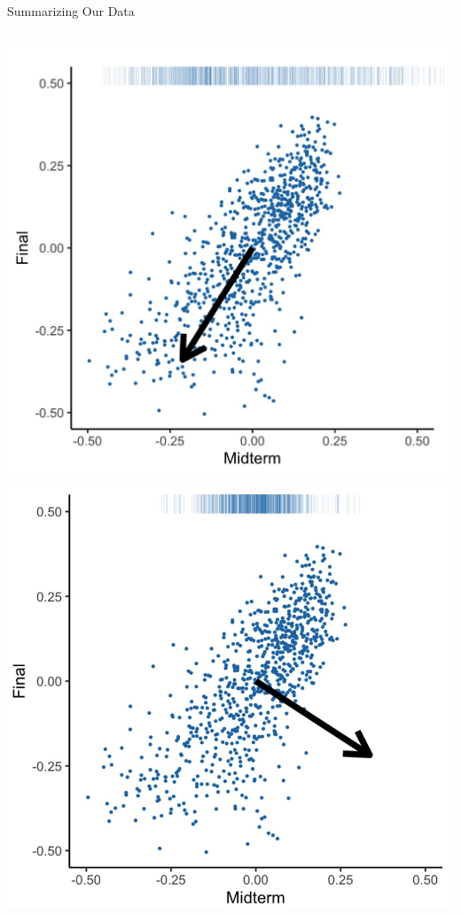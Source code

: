 \documentclass[aspectratio=169]{../latex_main/tntbeamer}  %
\begin{document}
\begin{frame}{Summarizing Our Data}
\begin{columns}
\begin{column}{.5\textwidth}
	                    \centering
	                    \includegraphics[scale=.1]{vect1}
	                    \includegraphics[scale=.1]{vect2}

\end{column}
\end{columns}
\end{frame}
\end{document}
